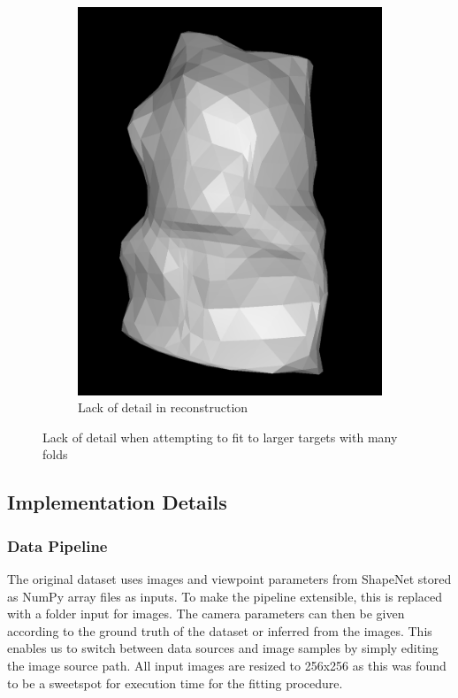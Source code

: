 \documentclass{article}
\begin{document}
\begin{figure}[h!]
\begin{subfigure}{0.25\textwidth}
    \includegraphics[width=\textwidth]{images/teddyfailure.png}
    \caption{Lack of detail in reconstruction}
    \label{teddyfailure}
  \end{subfigure}
  \caption{Lack of detail when attempting to fit to larger targets with many folds}
  \label{teddytarget}
\end{figure}

\subsection{Implementation Details}

\subsubsection{Data Pipeline}
\label{section:datapipe}

The original dataset uses images and viewpoint parameters from ShapeNet stored as NumPy array files as inputs. To make the pipeline extensible, this is replaced with a folder input for images. The camera parameters can then be given according to the ground truth of the dataset or inferred from the images. This enables us to switch between data sources and image samples by simply editing the image source path. All input images are resized to 256x256 as this was found to be a sweetspot for execution time for the fitting procedure.
\end{document}
